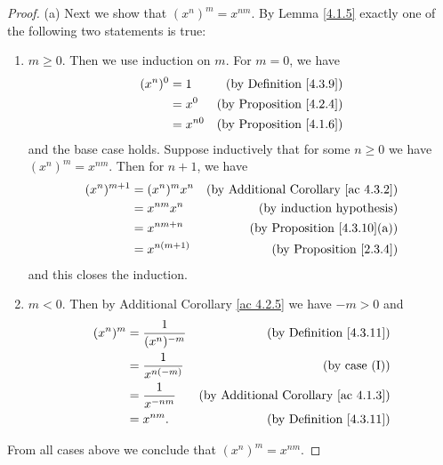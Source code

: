 \begin{proof}{(a)}
    Next we show that \((x^n)^m = x^{nm}\).
    By Lemma \ref{4.1.5} exactly one of the following two statements is true:
    \begin{enumerate}[label=(\Roman*)]
        \item \(m \geq 0\).
              Then we use induction on \(m\).
              For \(m = 0\), we have
              \begin{align*}
                  (x^n)^0 & = 1      & \text{(by Definition \ref{4.3.9})}  \\
                          & = x^0    & \text{(by Proposition \ref{4.2.4})} \\
                          & = x^{n0} & \text{(by Proposition \ref{4.1.6})}
              \end{align*}
              and the base case holds.
              Suppose inductively that for some \(n \geq 0\) we have \((x^n)^m = x^{nm}\).
              Then for \(n + 1\), we have
              \begin{align*}
                  (x^n)^{m + 1} & = (x^n)^m x^n  & \text{(by Additional Corollary \ref{ac 4.3.2})} \\
                                & = x^{nm} x^n   & \text{(by induction hypothesis)}                \\
                                & = x^{nm + n}   & \text{(by Proposition \ref{4.3.10}(a))}         \\
                                & = x^{n(m + 1)} & \text{(by Proposition \ref{2.3.4})}
              \end{align*}
              and this closes the induction.
        \item \(m < 0\).
              Then by Additional Corollary \ref{ac 4.2.5} we have \(-m > 0\) and
              \begin{align*}
                  (x^n)^m & = \frac{1}{(x^n)^{-m}} & \text{(by Definition \ref{4.3.11})}             \\
                          & = \frac{1}{x^{n(-m)}}  & \text{(by case (I))}                            \\
                          & = \frac{1}{x^{-nm}}    & \text{(by Additional Corollary \ref{ac 4.1.3})} \\
                          & = x^{nm}.              & \text{(by Definition \ref{4.3.11})}
              \end{align*}
    \end{enumerate}
    From all cases above we conclude that \((x^n)^m = x^{nm}\).


\end{proof}
